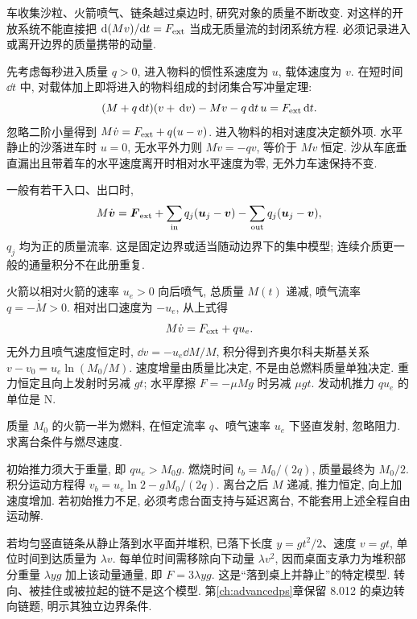 \label{ch:massflow}
车收集沙粒、火箭喷气、链条越过桌边时, 研究对象的质量不断改变. 对这样的开放系统不能直接把 $\mathrm d(Mv)/\mathrm dt=F_{\rm ext}$ 当成无质量流的封闭系统方程. 必须记录进入或离开边界的质量携带的动量.

先考虑每秒进入质量 $q>0$, 进入物料的惯性系速度为 $u$, 载体速度为 $v$. 在短时间 $\dd t$ 中, 对载体加上即将进入的物料组成的封闭集合写冲量定理:
\begin{equation}
(M+q\,\mathrm d t)(v+\,\mathrm d v)-Mv-q\,\mathrm d t\,u=F_{\rm ext}\,\mathrm d t.
\end{equation}
忽略二阶小量得到 $M\dot v=F_{\rm ext}+q(u-v)$. 进入物料的相对速度决定额外项. 水平静止的沙落进车时 $u=0$, 无水平外力则 $M\dot v=-qv$, 等价于 $Mv$ 恒定. 沙从车底垂直漏出且带着车的水平速度离开时相对水平速度为零, 无外力车速保持不变.

一般有若干入口、出口时,
\begin{equation}
M\dot{\boldsymbol{v}}=\boldsymbol{F}_{\rm ext}
 +\sum_{\rm in}q_j(\boldsymbol{u}_j-\boldsymbol{v})
 -\sum_{\rm out}q_j(\boldsymbol{u}_j-\boldsymbol{v}),
\end{equation}
$q_j$ 均为正的质量流率. 这是固定边界或适当随动边界下的集中模型; 连续介质更一般的通量积分不在此册重复.

火箭以相对火箭的速率 $u_e>0$ 向后喷气, 总质量 $M(t)$ 递减, 喷气流率 $q=-\dot M>0$. 相对出口速度为 $-u_e$, 从上式得
\begin{equation}
M\dot v=F_{\rm ext}+qu_e.
\end{equation}
无外力且喷气速度恒定时, $\dd v=-u_e\dd M/M$, 积分得到齐奥尔科夫斯基关系 $v-v_0=u_e\ln(M_0/M)$. 速度增量由质量比决定, 不是由总燃料质量单独决定. 重力恒定且向上发射时另减 $gt$; 水平摩擦 $F=-\mu Mg$ 时另减 $\mu gt$. 发动机推力 $qu_e$ 的单位是 N.

\begin{example}
质量 $M_0$ 的火箭一半为燃料, 在恒定流率 $q$、喷气速率 $u_e$ 下竖直发射, 忽略阻力. 求离台条件与燃尽速度.
\end{example}
\begin{solution}
初始推力须大于重量, 即 $qu_e>M_0g$. 燃烧时间 $t_b=M_0/(2q)$, 质量最终为 $M_0/2$. 积分运动方程得 $v_b=u_e\ln2-gM_0/(2q)$. 离台之后 $M$ 递减, 推力恒定, 向上加速度增加. 若初始推力不足, 必须考虑台面支持与延迟离台, 不能套用上述全程自由运动解.
\end{solution}

若均匀竖直链条从静止落到水平面并堆积, 已落下长度 $y=gt^2/2$、速度 $v=gt$, 单位时间到达质量为 $\lambda v$. 每单位时间需移除向下动量 $\lambda v^2$, 因而桌面支承力为堆积部分重量 $\lambda yg$ 加上该动量通量, 即 $F=3\lambda yg$. 这是“落到桌上并静止”的特定模型. 转向、被挂住或被拉起的链不是这个模型. 第\ref{ch:advancedps}章保留 8.012 的桌边转向链题, 明示其独立边界条件.

